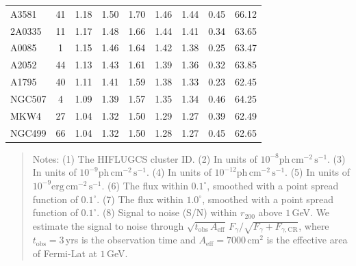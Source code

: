\documentclass[10pt,aps,pra,reprint,amsmath,amsfonts,amssymb,showpacs,nofootinbib,floatfix]{revtex4-1}
\newcommand{\rmn}{\mathrm}
\newcommand{\cm}{\rmn{cm}}
\newcommand{\CR}{\rmn{CR}}
\newcommand{\rvir}{r_{200}}
\begin{document}
\begin{table}
\begin{minipage}{2.0\columnwidth}
\begin{tabular}{l c c c c c c c c}
A3581 & 41 & 1.18 & 1.50 & 1.70 & 1.46 & 1.44 & 0.45 & 66.12 \\
2A0335 & 11 & 1.17 & 1.48 & 1.66 & 1.44 & 1.41 & 0.34 & 63.65 \\
A0085 & 1 & 1.15 & 1.46 & 1.64 & 1.42 & 1.38 & 0.25 & 63.47 \\
A2052 & 44 & 1.13 & 1.43 & 1.61 & 1.39 & 1.36 & 0.32 & 63.85 \\
A1795 & 40 & 1.11 & 1.41 & 1.59 & 1.38 & 1.33 & 0.23 & 62.45 \\
NGC507 & 4 & 1.09 & 1.39 & 1.57 & 1.35 & 1.34 & 0.46 & 64.25 \\
MKW4 & 27 & 1.04 & 1.32 & 1.50 & 1.29 & 1.27 & 0.39 & 62.49 \\
NGC499 & 66 & 1.04 & 1.32 & 1.50 & 1.28 & 1.27 & 0.45 & 62.65 \\
\hline
\hline
\end{tabular}
\begin{quote}
  Notes:
   (1) The HIFLUGCS cluster ID.
   (2) In units of $10^{-8} \rmn{ph}\,\rmn{cm}^{-2}\,\rmn{s}^{-1}$.
   (3) In units of $10^{-9} \rmn{ph}\,\rmn{cm}^{-2}\,\rmn{s}^{-1}$.
   (4) In units of $10^{-12} \rmn{ph}\,\rmn{cm}^{-2}\,\rmn{s}^{-1}$.
   (5) In units of $10^{-9} \rmn{erg}\,\rmn{cm}^{-2}\,\rmn{s}^{-1}$.
   (6) The flux within $0.1^\circ$, smoothed with a point spread function of $0.1^\circ$.
   (7) The flux within $1.0^\circ$, smoothed with a point spread function of $0.1^\circ$.
   (8) Signal to noise (S/N) within $\rvir$ above $1\,$GeV. We estimate the signal to
  noise through $\sqrt{t_\rmn{obs}\,A_\rmn{eff}}\,F_{\gamma}/\sqrt{F_{\gamma}+F_{\gamma,\CR}}$,
  where $t_\rmn{obs}=3\,$yrs is the observation time and $A_\rmn{eff} = 7000\,\cm^2$
    is the effective area of Fermi-Lat at $1\,$GeV.
 \label{tab:flux_tab_LP}
  \end{quote}
\end{minipage}
\end{table}
\end{document}
